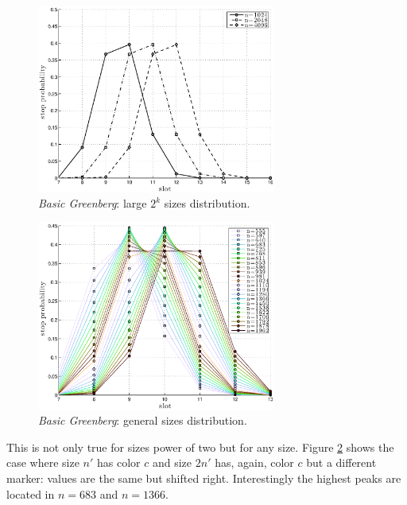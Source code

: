\documentclass[11pt,a4paper,twoside,openright]{book}
\begin{document}
\begin{figure}[H]
\begin{center}
\includegraphics[width=0.7\textwidth]{matlab/Greenberg_stop_prob/greenberg-stop-distribution-uniformity}
\caption{\emph{Basic Greenberg}:  large $2^{k}$ sizes distribution.}
\label{fig:greenberg-dist-large}
\end{center}
\end{figure}


\begin{figure}[H]
\begin{center}
\includegraphics[width=0.7\textwidth]{matlab/Greenberg_stop_prob/greenberg-stop-distribution-intermediate-values}
\caption{\emph{Basic Greenberg}:  general sizes distribution.}
\label{fig:greenberg-dist-general}
\end{center}
\end{figure}
This is not only true for sizes power of two but for any size. Figure \ref{fig:greenberg-dist-general} shows the case where size $n'$ has color $c$ and size $2n'$ has, again, color $c$ but a different marker: values are the same but shifted right. Interestingly the highest peaks are located in $n=683$ and $n=1366$.
\end{document}
